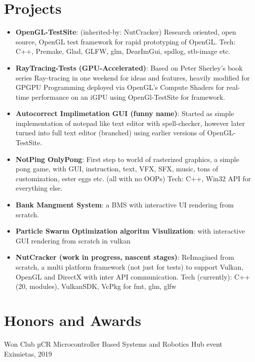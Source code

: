 \documentclass[a4paper,20pt]{article}
\newcommand{\resumeItem}[2]{
  \item\small{
    \textbf{#1}{: #2 \vspace{-2pt}}
  }
}
\newcommand{\resumeSubItem}[2]{\resumeItem{#1}{#2}\vspace{-3pt}}
\newcommand{\resumeSubHeadingListStart}{\begin{itemize}[leftmargin=*]}
\newcommand{\resumeSubHeadingListEnd}{\end{itemize}}
\begin{document}
\section{Projects}
\resumeSubHeadingListStart
\resumeSubItem{OpenGL-TestSite}{(inherited-by: NutCracker) Research oriented, open source, OpenGL test framework for rapid prototyping of OpenGL. Tech: C++, Premake, Glad, GLFW, glm, DearImGui, spdlog, stb-image etc. }\hspace{26pt}{(May-Oct '21)}
\vspace{2pt}
\resumeSubItem{RayTracing-Tests (GPU-Accelerated)}{Based on Peter Sherley’s book series Ray-tracing in one weekend for ideas and features, heavily modified for GPGPU Programming deployed via OpenGL's Compute Shaders for real-time performance on an iGPU using OpenGl-TestSite for framework.}\hspace{265pt}{(Jun-Aug '21)}
\vspace{2pt}
\resumeSubItem{Autocorrect Implimetation GUI (funny name)}{Started as simple implementation of notepad like text editor with spell-checker, however later turned into full text editor (branched) using earlier versions of OpenGL-TestSite.}{(May-Aug '21)}
\vspace{2pt}
\resumeSubItem{NotPing OnlyPong}{First step to world of rasterized graphics, a simple pong game, with GUI, instruction, text, VFX, SFX, music, tons of customization, ester eggs etc. (all with no OOPs) Tech: C++, Win32 API for everything else.}\hspace{20pt}{(May '20)}
\vspace{2pt}
\resumeSubItem{Bank Mangment System}{a BMS with interactive UI rendering from scratch.}\hspace{134pt}{(May '20)}
\vspace{2pt}
\resumeSubItem{Particle Swarm Optimization algoritm Visulization}{with interactive GUI rendering from scratch in vulkan}
\hspace{5pt}{(May '22)}
\vspace{2pt}
\resumeSubItem{NutCracker (work in progress, nascent stages)}{ReImagined from scratch, a multi platform framework (not just for tests) to support Vulkan, OpenGL and DirectX with inter API communication. Tech (currently): C++(20, modules), VulkanSDK, VcPkg for fmt, glm, glfw }\hspace{280pt}{(May-present '22)}
\resumeSubHeadingListEnd
\vspace{-5pt}
\section{Honors and Awards}
\begin{description}[font=$\bullet$]
\item {Won Club µCR Microcontroller Based Systems and Robotics Hub event Eximietas, 2019 }
\end{description}
\vspace{-5pt}
\end{document}
